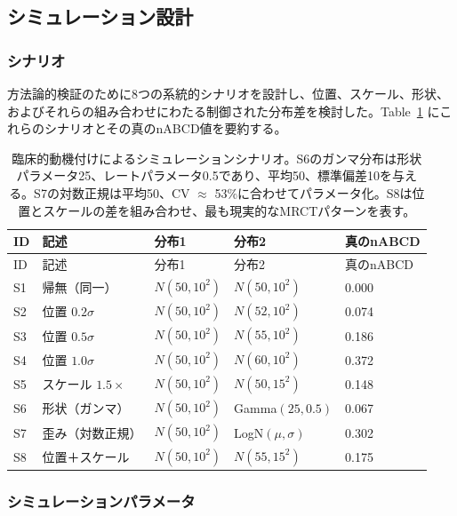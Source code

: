 \documentclass[
  a4paper,
  11pt]{ltjsarticle}
\begin{document}
\subsection{シミュレーション設計}\label{ux30b7ux30dfux30e5ux30ecux30fcux30b7ux30e7ux30f3ux8a2dux8a08}

\subsubsection{シナリオ}\label{ux30b7ux30caux30eaux30aa}

方法論的検証のために8つの系統的シナリオを設計し、位置、スケール、形状、およびそれらの組み合わせにわたる制御された分布差を検討した。Table~\ref{tbl-scenarios}
にこれらのシナリオとその真のnABCD値を要約する。

\begin{longtable}[]{@{}lllll@{}}
\caption{臨床的動機付けによるシミュレーションシナリオ。S6のガンマ分布は形状パラメータ25、レートパラメータ0.5であり、平均50、標準偏差10を与える。S7の対数正規は平均50、CV
\(\approx\)
53\%に合わせてパラメータ化。S8は位置とスケールの差を組み合わせ、最も現実的なMRCTパターンを表す。}\label{tbl-scenarios}\tabularnewline
\toprule\noalign{}
ID & 記述 & 分布1 & 分布2 & 真のnABCD \\
\midrule\noalign{}
\endfirsthead
\toprule\noalign{}
ID & 記述 & 分布1 & 分布2 & 真のnABCD \\
\midrule\noalign{}
\endhead
\bottomrule\noalign{}
\endlastfoot
S1 & 帰無（同一） & \(N(50, 10^2)\) & \(N(50, 10^2)\) & 0.000 \\
S2 & 位置 \(0.2\sigma\) & \(N(50, 10^2)\) & \(N(52, 10^2)\) & 0.074 \\
S3 & 位置 \(0.5\sigma\) & \(N(50, 10^2)\) & \(N(55, 10^2)\) & 0.186 \\
S4 & 位置 \(1.0\sigma\) & \(N(50, 10^2)\) & \(N(60, 10^2)\) & 0.372 \\
S5 & スケール \(1.5\times\) & \(N(50, 10^2)\) & \(N(50, 15^2)\) &
0.148 \\
S6 & 形状（ガンマ） & \(N(50, 10^2)\) & Gamma\((25, 0.5)\) & 0.067 \\
S7 & 歪み（対数正規） & \(N(50, 10^2)\) & LogN\((\mu, \sigma)\) &
0.302 \\
S8 & 位置＋スケール & \(N(50, 10^2)\) & \(N(55, 15^2)\) & 0.175 \\
\end{longtable}

\subsubsection{シミュレーションパラメータ}\label{ux30b7ux30dfux30e5ux30ecux30fcux30b7ux30e7ux30f3ux30d1ux30e9ux30e1ux30fcux30bf}
\end{document}
